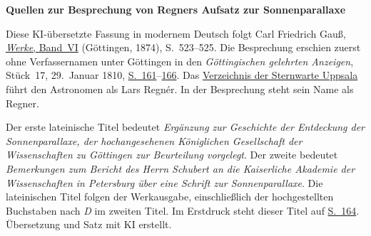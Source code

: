 \clearpage\thispagestyle{empty}
\begin{center}\textbf{Quellen zur Besprechung von Regners Aufsatz zur Sonnenparallaxe}\end{center}
\noindent Diese KI-übersetzte Fassung in modernem Deutsch folgt Carl Friedrich Gauß, \href{https://gdz.sub.uni-goettingen.de/id/PPN236007467}{\emph{Werke}, Band~VI} (Göttingen, 1874), S.~523–525. Die Besprechung erschien zuerst ohne Verfassernamen unter Göttingen in den \emph{Göttingischen gelehrten Anzeigen}, Stück~17, 29.~Januar 1810, \href{https://images.p.sub.uni-goettingen.de/iiif/image/gdz:PPN319721507_1810:00000193/full/1650,/0/default.jpg}{S.~161}–\href{https://images.p.sub.uni-goettingen.de/iiif/image/gdz:PPN319721507_1810:00000198/full/1650,/0/default.jpg}{166}. Das \href{https://www.astro.uu.se/history/profflist_eng.html}{Verzeichnis der Sternwarte Uppsala} führt den Astronomen als Lars Regnér. In der Besprechung steht sein Name als Regner.

\noindent Der erste lateinische Titel bedeutet \emph{Ergänzung zur Geschichte der Entdeckung der Sonnenparallaxe, der hochangesehenen Königlichen Gesellschaft der Wissenschaften zu Göttingen zur Beurteilung vorgelegt}. Der zweite bedeutet \emph{Bemerkungen zum Bericht des Herrn Schubert an die Kaiserliche Akademie der Wissenschaften in Petersburg über eine Schrift zur Sonnenparallaxe}. Die lateinischen Titel folgen der Werkausgabe, einschließlich der hochgestellten Buchstaben nach \emph{D} im zweiten Titel. Im Erstdruck steht dieser Titel auf \href{https://images.p.sub.uni-goettingen.de/iiif/image/gdz:PPN319721507_1810:00000196/full/1650,/0/default.jpg}{S.~164}. Übersetzung und Satz mit KI erstellt.
\clearpage
